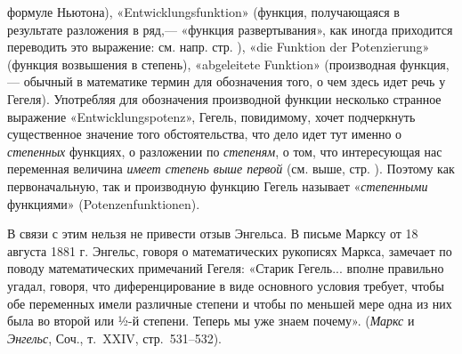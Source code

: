 \begin{enumerate}
формуле Ньютона), «Entwicklungsfunktion» (функция, получающаяся в
результате разложения в ряд,— «функция развертывания», как иногда
приходится переводить это выражение: см. напр. стр. \pageref{bkm:bm53b}),
«die Funktion der Potenzierung» (функция возвышения в степень),
«abgeleitete Funktion» (производная функция,— обычный в математике термин
для обозначения того, о чем здесь идет речь у Гегеля). Употребляя для
обозначения производной функции несколько странное выражение
«Entwicklungspotenz», Гегель, повидимому, хочет подчеркнуть существенное
значение того обстоятельства, что дело идет тут именно о {\em степенных}
функциях, о разложении по {\em степеням}, о том, что интересующая нас
переменная величина {\em имеет степень выше первой} (см. выше, стр.
\pageref{bkm:bm53c}). Поэтому как первоначальную, так и производную функцию
Гегель называет «{\em степенными} функциями» (Potenzenfunktionen).
\end{enumerate}
В связи с этим нельзя не привести отзыв Энгельса. В письме Марксу от 18
августа 1881 г. Энгельс, говоря о математических рукописях Маркса, замечает
по поводу математических примечаний Гегеля: «Старик Гегель... вполне
правильно угадал, говоря, что диференцирование в виде основного условия
требует, чтобы обе переменных имели различные степени и чтобы по меньшей
мере одна из них была во второй или ½-й степени. Теперь мы уже знаем
почему». ({\em Маркс} и {\em Энгельс}, Соч., т.~XXIV, стр.~531–532).

